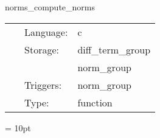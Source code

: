 
\hspace{5mm} norms\_compute\_norms 

\hspace{5mm}{\it compute the norm } 


\hspace{5mm}

 \begin{tabular*}{160mm}{cll} 
~ & Language:  & c \\ 
~ & Storage:  & diff\_term\_group \\ 
~& ~ &norm\_group\\ 
~ & Triggers:  & norm\_group \\ 
~ & Type:  & function \\ 
\end{tabular*} 



\vspace{5mm}\parskip = 10pt 
